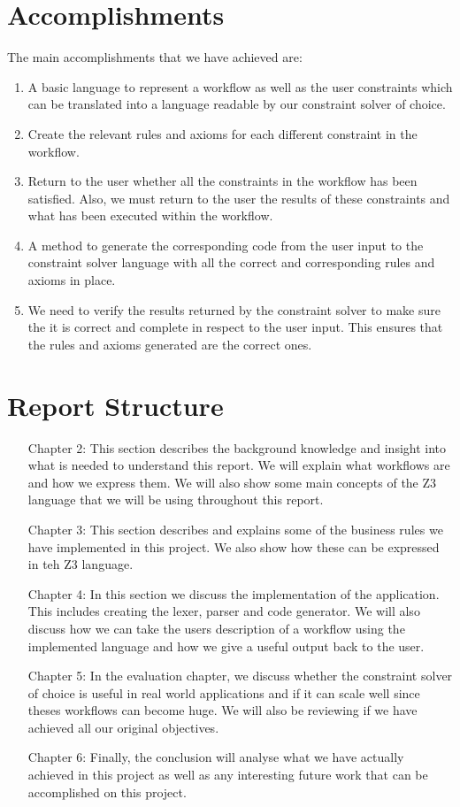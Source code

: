 \documentclass[a4paper]{report}
\begin{document}
\section{Accomplishments}
The main accomplishments that we have achieved are:
\begin{enumerate}
\item A basic language to represent a workflow as well as the user constraints which can be translated into a language readable by our constraint solver of choice.
\item Create the relevant rules and axioms for each different constraint in the workflow.
\item Return to the user whether all the constraints in the workflow has been satisfied. Also, we must return to the user the results of these constraints and what has been executed within the workflow.
\item A method to generate the corresponding code from the user input to the constraint solver language with all the correct and corresponding rules and axioms in place. 
\item We need to verify the results returned by the constraint solver to make sure the it is correct and complete in respect to the user input. This ensures that the rules and axioms generated are the correct ones. 
\end{enumerate}

\section{Report Structure}
\begin{itemize}
\item[Chapter 2:] This section describes the background knowledge and insight into what is needed to understand this report. We will explain what workflows are and how we express them. We will also show some main concepts of the Z3 language that we will be using throughout this report.  
\item[Chapter 3:] This section describes and explains some of the business rules we have implemented in this project. We also show how these can be expressed in teh Z3 language. 
\item[Chapter 4:] In this section we discuss the implementation of the application. This includes creating the lexer, parser and code generator. We will also discuss how we can take the users description of a workflow using the implemented language and how we give a useful output back to the user.
\item[Chapter 5:] In the evaluation chapter, we discuss whether the constraint solver of choice is useful in real world applications and if it can scale well since theses workflows can become huge. We will also be reviewing if we have achieved all our original objectives.
\item[Chapter 6:] Finally, the conclusion will analyse what we have actually achieved in this project as well as any interesting future work that can be accomplished on this project. 
\end{itemize}
\end{document}
